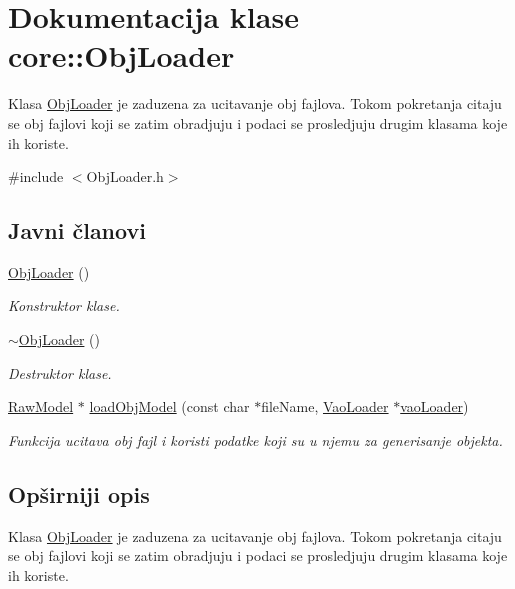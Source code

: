 \hypertarget{classcore_1_1ObjLoader}{}\section{Dokumentacija klase core\+:\+:Obj\+Loader}
\label{classcore_1_1ObjLoader}


Klasa \hyperlink{classcore_1_1ObjLoader}{Obj\+Loader} je zaduzena za ucitavanje obj fajlova. Tokom pokretanja citaju se obj fajlovi koji se zatim obradjuju i podaci se prosledjuju drugim klasama koje ih koriste.  




{\ttfamily \#include $<$Obj\+Loader.\+h$>$}

\subsection*{Javni članovi}
\begin{DoxyCompactItemize}
\item 
\hyperlink{classcore_1_1ObjLoader_a4cdb4b0e2d995d3ea0f51f255e791aaa}{Obj\+Loader} ()
\begin{DoxyCompactList}\small\item\em Konstruktor klase. \end{DoxyCompactList}\item 
\hyperlink{classcore_1_1ObjLoader_a127a52d790309d913f7f3711a5d8c3f4}{$\sim$\+Obj\+Loader} ()
\begin{DoxyCompactList}\small\item\em Destruktor klase. \end{DoxyCompactList}\item 
\hyperlink{classmodel_1_1RawModel}{Raw\+Model} $\ast$ \hyperlink{classcore_1_1ObjLoader_a47f303f773dfbd6d33598a53a1dbcbc4}{load\+Obj\+Model} (const char $\ast$file\+Name, \hyperlink{classcore_1_1VaoLoader}{Vao\+Loader} $\ast$\hyperlink{namespacecore_a78dd24784c415d3759a0f71b8f4f9f81}{vao\+Loader})
\begin{DoxyCompactList}\small\item\em Funkcija ucitava obj fajl i koristi podatke koji su u njemu za generisanje objekta. \end{DoxyCompactList}\end{DoxyCompactItemize}


\subsection{Opširniji opis}
Klasa \hyperlink{classcore_1_1ObjLoader}{Obj\+Loader} je zaduzena za ucitavanje obj fajlova. Tokom pokretanja citaju se obj fajlovi koji se zatim obradjuju i podaci se prosledjuju drugim klasama koje ih koriste. 

